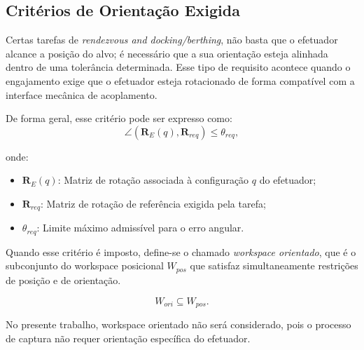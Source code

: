 \subsection{Critérios de Orientação Exigida}
\label{sec:criterios_orientacao_exigida}

Certas tarefas de \emph{rendezvous and docking/berthing}, não basta que o efetuador alcance a posição do alvo; é necessário que a sua orientação esteja alinhada dentro de uma tolerância determinada.  
Esse tipo de requisito acontece quando o engajamento exige que o efetuador esteja rotacionado de forma compatível com a interface mecânica de acoplamento.

De forma geral, esse critério pode ser expresso como:
\begin{equation}
\label{eq:workspace_orientado}
\angle(\mathbf{R}_E(q), \mathbf{R}_{req}) \leq \theta_{req},
\end{equation}

onde:
\begin{itemize}
    \item $\mathbf{R}_E(q)$: Matriz de rotação associada à configuração $q$ do efetuador;
    \item $\mathbf{R}_{req}$: Matriz de rotação de referência exigida pela tarefa;
    \item $\theta_{req}$: Limite máximo admissível para o erro angular.
\end{itemize}

Quando esse critério é imposto, define-se o chamado \emph{workspace orientado}, que é o subconjunto do workspace posicional $W_{pos}$ que satisfaz simultaneamente restrições de posição e de orientação.

\begin{equation}
W_{ori} \subseteq W_{pos}.
\end{equation}

No presente trabalho, workspace orientado não será considerado, pois o processo de captura não requer orientação específica do efetuador.
